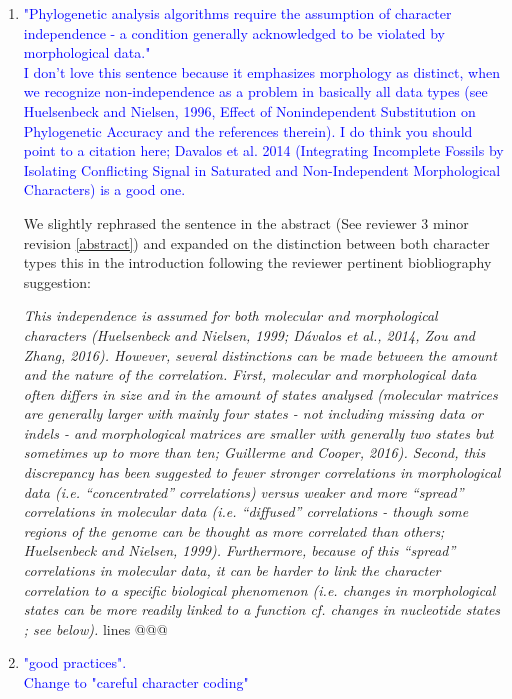 \documentclass[12pt,letterpaper]{article}
\begin{document}
\begin{enumerate}

\item{\textcolor{blue}{"Phylogenetic analysis algorithms require the assumption of character independence - a condition generally acknowledged to be violated by morphological data."\\
I don't love this sentence because it emphasizes morphology as distinct, when we recognize non-independence as a problem in basically all data types (see Huelsenbeck and Nielsen, 1996, Effect of Nonindependent Substitution on Phylogenetic Accuracy and the references therein). I do think you should point to a citation here; Davalos et al. 2014 (Integrating Incomplete Fossils by Isolating Conflicting Signal in Saturated and Non-Independent Morphological Characters) is a good one.}}
\label{molecular}

We slightly rephrased the sentence in the abstract (See reviewer 3 minor revision \ref{abstract}) and expanded on the distinction between both character types this in the introduction following the reviewer pertinent biobliography suggestion:

\textit{This independence is assumed for both molecular and morphological characters (Huelsenbeck and Nielsen, 1999; D\'{a}valos et al., 2014, Zou and Zhang, 2016).
However, several distinctions can be made between the amount and the nature of the correlation.
First, molecular and morphological data often differs in size and in the amount of states analysed (molecular matrices are generally larger with mainly four states - not including missing data or indels - and morphological matrices are smaller with generally two states but sometimes up to more than ten; Guillerme and Cooper, 2016).
Second, this discrepancy has been suggested to fewer stronger correlations in morphological data (i.e. ``concentrated'' correlations) versus weaker and more ``spread'' correlations in molecular data (i.e. ``diffused'' correlations - though some regions of the genome can be thought as more correlated than others; Huelsenbeck and Nielsen, 1999).
Furthermore, because of this ``spread'' correlations in molecular data, it can be harder to link the character correlation to a specific biological phenomenon (i.e. changes in morphological states can be more readily linked to a function cf. changes in nucleotide states ; see below).} lines @@@

\item{\textcolor{blue}{"good practices".\\
Change to "careful character coding"}}


\end{enumerate}
\end{document}
